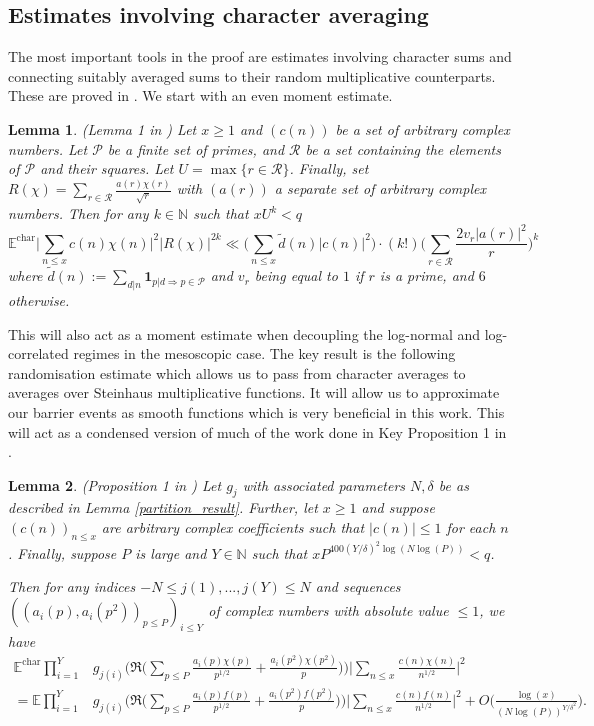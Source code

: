 \documentclass[reqno]{amsart}
\newtheorem{lemma}{Lemma}
\theoremstyle{definition}
\theoremstyle{remark}
\numberwithin{equation}{section}
\theoremstyle{remark}
\begin{document}
\subsection{Estimates involving character averaging}
The most important tools in the proof are estimates involving character sums and connecting suitably averaged sums to their random multiplicative counterparts. These are proved in \cite{harper2023typicalsizecharacterzeta}. We start with an even moment estimate.
\begin{lemma}
    (Lemma 1 in \cite{harper2023typicalsizecharacterzeta}) Let $x \geq 1$ and $(c(n))$ be a set of arbitrary complex numbers. Let $\mathcal{P}$ be a finite set of primes, and $\mathcal{R}$ be a set containing the elements of $\mathcal{P}$ and their squares. Let $U = \max\{r \in \mathcal{R}\}$. Finally, set $R(\chi) = \sum_{r \in \mathcal{R}}\frac{a(r)\chi(r)}{\sqrt{r}}$ with $(a(r))$ a separate set of arbitrary complex numbers. Then for any $k \in \mathbb{N}$ such that $xU^k < q$
    $$\mathbb{E}^{\text{char}}\big|\sum_{n \leq x}c(n)\chi(n)\big|^2|R(\chi)|^{2k} \ll \big(\sum_{n \leq x}\tilde{d}(n)|c(n)|^2\big)\cdot(k!)\big(\sum_{r \in \mathcal{R}}\frac{2v_r|a(r)|^2}{r}\big)^k$$
    where $\tilde{d}(n) := \sum_{d|n}\mathbf{1}_{p|d \Rightarrow p \in \mathcal{P}}$ and $v_r$ being equal to $1$ if $r$ is a prime, and $6$ otherwise. \label{even_moment}
\end{lemma}
This will also act as a moment estimate when decoupling the log-normal and log-correlated regimes in the mesoscopic case. The key result is the following randomisation estimate which allows us to pass from character averages to averages over Steinhaus multiplicative functions. It will allow us to approximate our barrier events as smooth functions which is very beneficial in this work. This will act as a condensed version of much of the work done in Key Proposition 1 in \cite{harper2019partition}.
\begin{lemma}
     (Proposition 1 in \cite{harper2023typicalsizecharacterzeta}) Let $g_j$ with associated parameters $N,\delta$ be as described in Lemma \ref{partition_result}. Further, let $x \geq 1$ and suppose $(c(n))_{n \leq x}$ are arbitrary complex coefficients such that $|c(n)| \leq 1$ for each $n$. Finally, suppose $P$ is large and $Y \in \mathbb{N}$ such that $xP^{400(Y/\delta)^2\log(N\log(P))} < q$. \par
    Then for any indices $-N \leq j(1),...,j(Y)\leq N$ and sequences $((a_i(p),a_i(p^2))_{p \leq P})_{i \leq Y}$ of complex numbers with absolute value $\leq 1$, we have
    \begin{align*}
        \mathbb{E}^{\text{char}}\prod_{i=1}^Y&g_{j(i)}\big(\Re\big(\sum_{p \leq P}\frac{a_i(p)\chi(p)}{p^{1/2}} + \frac{a_i(p^2)\chi(p^2)}{p}\big)\big)\big|\sum_{n \leq x}\frac{c(n)\chi(n)}{n^{1/2}}\big|^2 \\
        = \mathbb{E}\prod_{i=1}^Y&g_{j(i)}\big(\Re\big(\sum_{p \leq P}\frac{a_i(p)f(p)}{p^{1/2}} + \frac{a_i(p^2)f(p^2)}{p}\big)\big)\big|\sum_{n \leq x}\frac{c(n)f(n)}{n^{1/2}}\big|^2 + O\big(\frac{\log(x)}{(N\log(P))^{Y/\delta^2}}\big).
    \end{align*} \label{randomisation}
\end{lemma}
\end{document}
